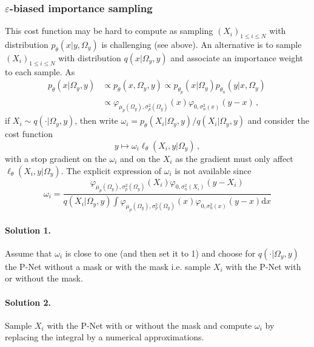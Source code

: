 \documentclass[review]{cvpr}
\begin{document}
\subsubsection{$\varepsilon$-biased importance sampling}
This cost function may be hard to compute as sampling $(X_i)_{1\leqslant i \leqslant N}$ with distribution $p_\theta(x|y,\Omega_y)$ is challenging (see above). An alternative is to sample $(X_i)_{1\leqslant i \leqslant N}$ with distribution $q(x|\Omega_y,y)$ and associate an importance weight to each sample. As
\begin{align*}
p_\theta(x|\Omega_y,y) &\propto p_\theta(x,\Omega_y,y) \propto p_{\theta_p}(x|\Omega_y)p_{\theta_n}(y|x,\Omega_y)\,\\
&\propto \varphi_{\mu_p(\Omega_y),\sigma^2_p(\Omega_y)}(x)   \varphi_{0,\sigma_n^2(x)}(y-x)\,,
\end{align*}
if $X_i \sim q(\cdot|\Omega_y,y)$, then write $\omega_i = p_\theta(X_i|\Omega_y,y)/q(X_i|\Omega_y,y)$ and consider the cost function
$$
y \mapsto \omega_i \ell_{\theta}(X_i,y|\Omega_y) \,,
$$
with a stop gradient on the $\omega_i$ and on the $X_i$ as the gradient must only affect $\ell_{\theta}(X_i,y|\Omega_y)$. The explicit expression of $\omega_i$ is not available since
$$
\omega_i = \frac{\varphi_{\mu_p(\Omega_y),\sigma^2_p(\Omega_y)}(X_i)   \varphi_{0,\sigma_n^2(X_i)}(y-X_i)}{q(X_i|\Omega_y,y) \int \varphi_{\mu_p(\Omega_y),\sigma^2_p(\Omega_y)}(x)   \varphi_{0,\sigma_n^2(x)}(y-x) \mathrm{d} x}
$$
\paragraph{Solution 1.} Assume that $\omega_i$ is close to one (and then set it to 1) and choose for $q(\cdot|\Omega_y,y)$ the P-Net without a mask or with the mask i.e. sample $X_i$ with the P-Net with or without the mask. 

\paragraph{Solution 2.} Sample $X_i$ with the P-Net with or without the mask and compute $\omega_i$ by replacing the integral by a numerical approximations. 
\end{document}
